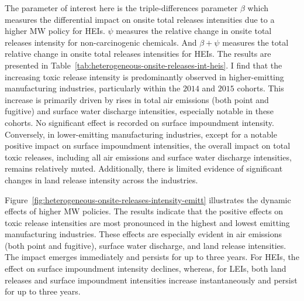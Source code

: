 \documentclass[12pt, english]{article}
\begin{document}
    The parameter of interest here is the triple-differences parameter $\beta$ which measures the differential impact on onsite total releases intensities due to a higher MW policy for HEIs. $\psi$ measures the relative change in onsite total releases intensity for non-carcinogenic chemicals. And $\beta + \psi$ measures the total relative change in onsite total releases intensities for HEIs. The results are presented in Table~\ref{tab:heterogeneous-onsite-releases-int-heis}. I find that the increasing toxic release intensity is predominantly observed in higher-emitting manufacturing industries, particularly within the $2014$ and $2015$ cohorts. This increase is primarily driven by rises in total air emissions (both point and fugitive) and surface water discharge intensities, especially notable in these cohorts. No significant effect is recorded on surface impoundment intensity. Conversely, in lower-emitting manufacturing industries, except for a notable positive impact on surface impoundment intensities, the overall impact on total toxic releases, including all air emissions and surface water discharge intensities, remains relatively muted. Additionally, there is limited evidence of significant changes in land release intensity across the industries.
    

    Figure~\ref{fig:heterogeneous-onsite-releases-intensity-emitt} illustrates the dynamic effects of higher MW policies. The results indicate that the positive effects on toxic release intensities are most pronounced in the highest and lowest emitting manufacturing industries. These effects are especially evident in air emissions (both point and fugitive), surface water discharge, and land release intensities. The impact emerges immediately and persists for up to three years. For HEIs, the effect on surface impoundment intensity declines, whereas, for LEIs, both land releases and surface impoundment intensities increase instantaneously and persist for up to three years.
\end{document}
